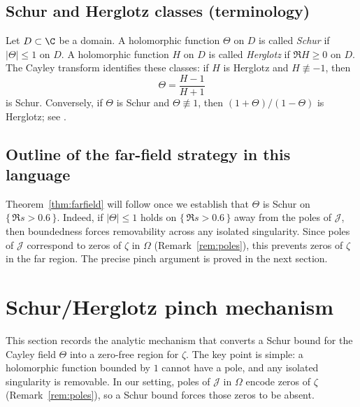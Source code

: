 \documentclass[11pt]{article}
\begin{document}
\subsection*{Schur and Herglotz classes (terminology)}
Let $D\subset\C$ be a domain.
A holomorphic function $\Theta$ on $D$ is called \emph{Schur} if $|\Theta|\le 1$ on $D$.
A holomorphic function $H$ on $D$ is called \emph{Herglotz} if $\Re H\ge 0$ on $D$.
The Cayley transform identifies these classes: if $H$ is Herglotz and $H\not\equiv -1$, then
\[
  \Theta=\frac{H-1}{H+1}
\]
is Schur.
Conversely, if $\Theta$ is Schur and $\Theta\not\equiv 1$, then $(1+\Theta)/(1-\Theta)$ is Herglotz; see \cite{Donoghue,RosenblumRovnyak}.

\subsection*{Outline of the far-field strategy in this language}
Theorem~\ref{thm:farfield} will follow once we establish that $\Theta$ is Schur on $\{\,\Re s>0.6\,\}$.
Indeed, if $|\Theta|\le 1$ holds on $\{\,\Re s>0.6\,\}$ away from the poles of $\mathcal J$, then boundedness forces removability across any isolated singularity.
Since poles of $\mathcal J$ correspond to zeros of $\zeta$ in $\Omega$ (Remark~\ref{rem:poles}), this prevents zeros of $\zeta$ in the far region.
The precise pinch argument is proved in the next section.

\section{Schur/Herglotz pinch mechanism}\label{sec:pinch}

This section records the analytic mechanism that converts a Schur bound for the Cayley field $\Theta$ into a zero-free region for $\zeta$.
The key point is simple: a holomorphic function bounded by $1$ cannot have a pole, and any isolated singularity is removable.
In our setting, poles of $\mathcal J$ in $\Omega$ encode zeros of $\zeta$ (Remark~\ref{rem:poles}), so a Schur bound forces those zeros to be absent.
\end{document}
